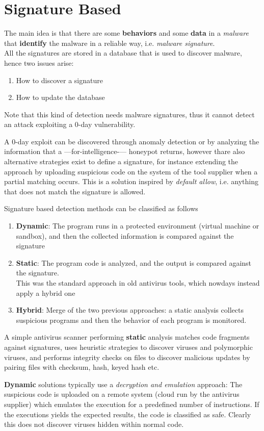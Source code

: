 \section{Signature Based}

The main idea is that there are some \textbf{behaviors} and some \textbf{data} in a \textit{malware} that \textbf{identify}
the malware in a reliable way, i.e. \textit{malware signature}.\\
All the signatures are stored in a database that is used to discover malware,
hence two issues arise:
\begin{enumerate}
   \item How to discover a signature
   \item How to update the database
\end{enumerate}
Note that this kind of detection needs malware signatures, thus it cannot detect an attack exploiting a 0-day vulnerability.

A 0-day exploit can be discovered through anomaly detection or by analyzing the
information that a {---}for-intelligence-{---} honeypot  returns,
however thare also alternative strategies exist to define a signature,
for instance
extending the approach by uploading suspicious code on the system of the tool supplier when a partial matching occurs.
This is a solution inspired by \textit{default allow},
i.e. anything that does not match the signature is allowed.\nl

Signature based detection methods can be classified as follows
\begin{enumerate}
   \item \textbf{Dynamic}:
   The program runs in a protected environment (virtual machine or sandbox), 
   and then the collected information is compared against the signature
   \item \textbf{Static}:
   The program code is analyzed, and the output is compared against the signature.\\
   This was the standard approach in old antivirus tools, which nowdays instead apply a hybrid one
   \item \textbf{Hybrid}:
   Merge of the two previous approaches:
   a static analysis collects suspicious programs and then the behavior of each program is monitored.
\end{enumerate}

A simple antivirus scanner performing \textbf{static} analysis
matches code fragments against signatures, uses heuristic strategies to discover viruses and polymorphic viruses,
and performs 
integrity checks on files to discover malicious updates by pairing files with checksum, hash, keyed hash etc.

\textbf{Dynamic} solutions typically use a \textit{decryption and emulation} approach:
The suspicious code is uploaded on a remote system 
(cloud run by the antivirus supplier)
which emulates the execution for a predefined number of
instructions.
If the executions yields the expected results,
the code is classified as safe.
Clearly this does not discover viruses hidden within normal code.